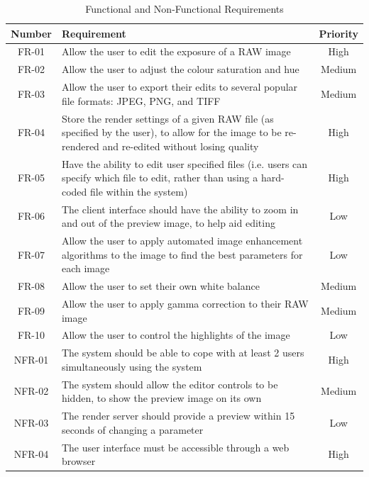 \documentclass[12pt,a4paper]{article}
\begin{document}
\begin{table}
  \centering
  \begin{tabular}{| c | p{12cm} | c |}
    \hline
    \textbf{Number} & \textbf{Requirement} & \textbf{Priority} \\
    \hline
    FR-01 & Allow the user to edit the exposure of a RAW image & High \\
    \hline
    FR-02 & Allow the user to adjust the colour saturation and hue & Medium \\
    \hline
    FR-03 & Allow the user to export their edits to several popular file formats: JPEG, PNG, and TIFF & Medium \\
    \hline
    FR-04 & Store the render settings of a given RAW file (as specified by the user), to allow for the image to be re-rendered and re-edited without losing quality & High \\
    \hline
    FR-05 & Have the ability to edit user specified files (i.e. users can specify which file to edit, rather than using a hard-coded file within the system) & High \\
    \hline
    FR-06 & The client interface should have the ability to zoom in and out of the preview image, to help aid editing & Low \\
    \hline
    FR-07 & Allow the user to apply automated image enhancement algorithms to the image to find the best parameters for each image & Low \\
    \hline
    FR-08 & Allow the user to set their own white balance & Medium\\
    \hline
    FR-09 & Allow the user to apply gamma correction to their RAW image & Medium\\
    \hline
    FR-10 & Allow the user to control the highlights of the image & Low\\
    \hline
    \hline
    NFR-01 & The system should be able to cope with at least 2 users simultaneously using the system & High \\
    \hline
    NFR-02 & The system should allow the editor controls to be hidden, to show the preview image on its own & Medium \\
    \hline
    NFR-03 & The render server should provide a preview within 15 seconds of changing a parameter & Low \\
    \hline
    NFR-04 & The user interface must be accessible through a web browser & High \\
    \hline
  \end{tabular}
  \caption{Functional and Non-Functional Requirements}
  \label{RequirementsTable}
\end{table}
\end{document}
